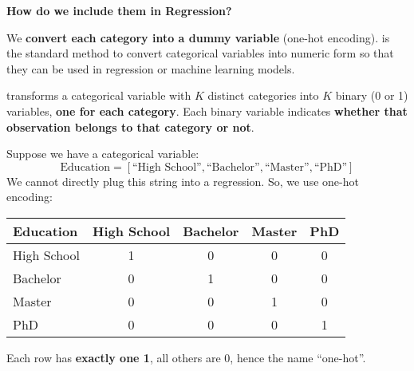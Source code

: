 \highspace
\begin{flushleft}
    \textcolor{Green3}{ \textbf{How do we include them in Regression?}}
\end{flushleft}
We \textbf{convert each category into a dummy variable} (one-hot encoding).  is the standard method to convert categorical variables into numeric form so that they can be used in regression or machine learning models.

\begin{definitionbox}
     transforms a categorical variable with $K$ distinct categories into $K$ binary (0 or 1) variables, \textbf{one for each category}. Each binary variable indicates \textbf{whether that observation belongs to that category or not}.
\end{definitionbox}

\begin{examplebox}
    Suppose we have a categorical variable:
    \begin{equation*}
        \text{Education} = \left[\text{``High School''}, \text{``Bachelor''}, \text{``Master''}, \text{``PhD''}\right]
    \end{equation*}
    We cannot directly plug this string into a regression. So, we use one-hot encoding:

    \begin{center}
        \begin{tabular}{@{} l | c | c | c | c @{}}
            \toprule
            Education   & High School   & Bachelor  & Master    & PhD   \\
            \midrule
            High School & 1             & 0         & 0         & 0     \\ [.3em]
            Bachelor    & 0             & 1         & 0         & 0     \\ [.3em]
            Master      & 0             & 0         & 1         & 0     \\ [.3em]
            PhD         & 0             & 0         & 0         & 1     \\
            \bottomrule
        \end{tabular}
    \end{center}

    Each row has \textbf{exactly one 1}, all others are 0, hence the name ``one-hot''.
\end{examplebox}

